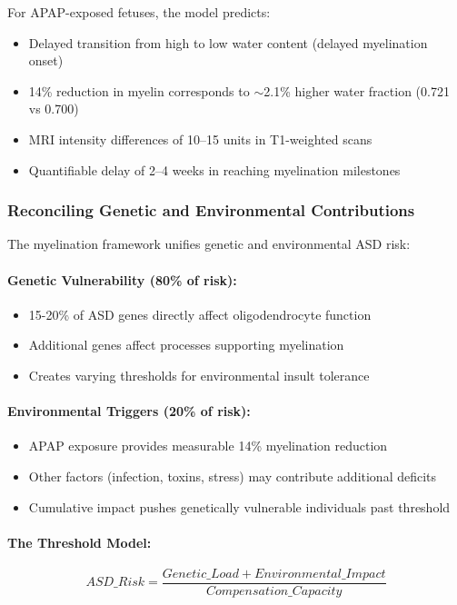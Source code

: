 \documentclass[11pt]{article}
\let\oldsubsubsection\subsubsection
\renewcommand{\subsubsection}[1]{\oldsubsubsection{#1}\setlength{\leftskip}{1.5em}}
\begin{document}
For APAP-exposed fetuses, the model predicts:
\begin{itemize}
\item Delayed transition from high to low water content (delayed myelination onset)
\item 14\% reduction in myelin corresponds to $\sim$2.1\% higher water fraction (0.721 vs 0.700)
\item MRI intensity differences of 10--15 units in T1-weighted scans
\item Quantifiable delay of 2--4 weeks in reaching myelination milestones
\end{itemize}

\subsubsection{Reconciling Genetic and Environmental Contributions}

The myelination framework unifies genetic and environmental ASD risk:

\paragraph{Genetic Vulnerability (80\% of risk):}
\begin{itemize}
\item 15-20\% of ASD genes directly affect oligodendrocyte function
\item Additional genes affect processes supporting myelination
\item Creates varying thresholds for environmental insult tolerance
\end{itemize}

\paragraph{Environmental Triggers (20\% of risk):}
\begin{itemize}
\item APAP exposure provides measurable 14\% myelination reduction
\item Other factors (infection, toxins, stress) may contribute additional deficits
\item Cumulative impact pushes genetically vulnerable individuals past threshold
\end{itemize}

\paragraph{The Threshold Model:}
\begin{equation}
ASD\_Risk = \frac{Genetic\_Load + Environmental\_Impact}{Compensation\_Capacity}
\end{equation}
\end{document}
